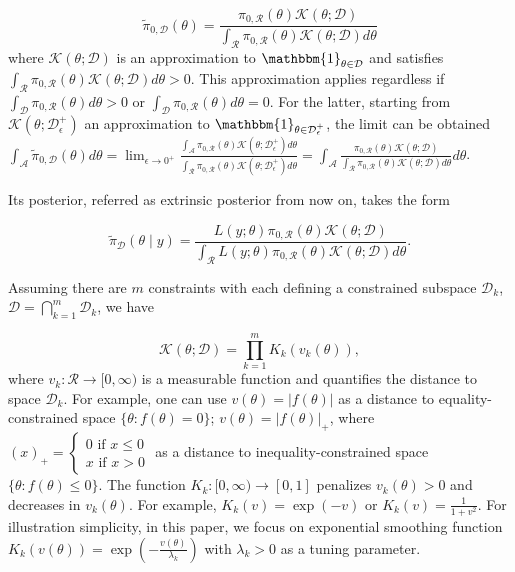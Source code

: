 \documentclass[10pt]{article}
\newcommand{\mc}[1]{\mathcal{#1}}
\DeclareMathOperator{\1}{\mathbbm{1}}
\begin{document}
\begin{equation}
\label{extrinsic_prior}
	\tilde{\pi}_{0,\mc D}(\theta) = \frac{ \pi_{0,\mc R}(\theta) \mc{K}( \theta; \mc D) }{ \int_{\mc R} \pi_{0,\mc R}(\theta) \mc{K}(\theta; \mc D)d\theta }
\end{equation}
where $\mc K(\theta; \mc D)$ is an approximation to $\mathbbm{1}_{\theta\in \mc D}$ and satisfies  $ \int_{\mc R} \pi_{0,\mc R}(\theta) \mc{K}(\theta; \mc D)d\theta>0$. This approximation applies regardless if $\int_{\mc D} \pi_{0,\mc R}(\theta) d\theta>0$ or $\int_{\mc D} \pi_{0,\mc R}(\theta) d\theta=0$. For the latter, starting from $\mc K(\theta;  \mc D^+_\epsilon)$ an approximation to $\mathbbm{1}_{\theta\in  \mc D^+_\epsilon}$, the limit can be obtained $
	\int_{\mc A} \tilde{\pi}_{0,\mc D}(\theta) d \theta =  \lim_{\epsilon\rightarrow 0^+}\frac{\int_{\mc A}  \pi_{0,\mc R}(\theta) \mc{K}( \theta; \mc D^+_\epsilon)d\theta }{ \int_{\mc R} \pi_{0,\mc R}(\theta) \mc{K}(\theta; \mc D^+_\epsilon)d\theta } = 	\int_{\mc A} \frac{ \pi_{0,\mc R}(\theta) \mc{K}( \theta; \mc D) }{ \int_{\mc R} \pi_{0,\mc R}(\theta) \mc{K}(\theta; \mc D)d\theta } d\theta$.

Its posterior, referred as extrinsic posterior from now on, takes the form

\begin{equation}
\label{extrinsic_posterior}
	\tilde{\pi}_{\mc D}(\theta \mid y) = \frac{ L(y;\theta)\pi_{0,\mc R}(\theta) \mc{K}( \theta; \mc D) }{ \int_{\mc R} L(y;\theta)\pi_{0,\mc R}(\theta) \mc{K}(\theta; \mc D)d\theta }.
\end{equation}


Assuming there are $m$ constraints with each defining a constrained subspace $\mc D_k$, $\mc D = \bigcap_{k=1}^m\mc D_k$, we have

\begin{equation}
\label{smoothing}
\mc K(\theta; \mc D)= \prod_{k=1}^m K_k(v_k(\theta)),
\end{equation}
where $v_k: \mc R \rightarrow [0,\infty)$ is a measurable function and quantifies the distance to space $\mc D_k$. For example, one can use $v(\theta)=|f(\theta)|$ as a distance to equality-constrained space  $\{\theta:f(\theta)=0\}$; $v(\theta)=|f(\theta)|_+$, where $(x)_+ = \left\{\begin{array}{cc}  0 \text{ if } x\le 0 \\ x \text{ if } x> 0\end{array}\right.$ as a distance to inequality-constrained space  $\{\theta:f(\theta) \le 0\}$. The function $K_k:[0,\infty)\rightarrow [0,1]$ penalizes $v_k(\theta)>0$ and decreases in $v_k(\theta)$. For example, $K_k(v)=\exp(-v)$ or $K_k(v)=\frac{1}{1+v^2}$. For illustration simplicity, in this paper, we focus on exponential smoothing function $K_k(v(\theta))=\exp(-\frac{v(\theta)}{\lambda_k})$ with $\lambda_k>0$ as a tuning parameter. 
\end{document}

